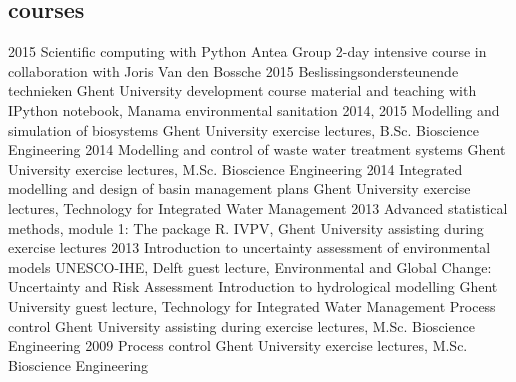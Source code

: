 \documentclass[]{stvhoey-cv}  %
\begin{document}
\subsection*{courses}
\begin{entrylist}
  \entry
    {2015}
    {Scientific computing with Python}
    {Antea Group}
    {2-day intensive course in collaboration with Joris Van den Bossche}
  \entry
    {2015}
    {Beslissingsondersteunende technieken}
    {Ghent University}
    {development course material and teaching with IPython notebook, Manama environmental sanitation}
  \entry
    {2014, 2015}
    {Modelling and simulation of biosystems}
    {Ghent University}
    {exercise lectures, B.Sc. Bioscience Engineering}
   \entry
    {2014} %
    {Modelling and control of waste water treatment systems}
    {Ghent University}
    {exercise lectures, M.Sc. Bioscience Engineering}
   \entry
    {2014}%
    {Integrated modelling and design of basin management plans}
    {Ghent University}
    {exercise lectures, Technology for Integrated Water Management}
   \entry
    {2013}
    {Advanced statistical methods, module 1: The package R.}
    {IVPV, Ghent University}
    {assisting during exercise lectures}
   \entry
    {2013}
    {Introduction to uncertainty assessment of environmental models}
    {UNESCO-IHE, Delft}
    {guest lecture, Environmental and Global Change: Uncertainty and Risk Assessment}
   \entry
    {}
    {Introduction to hydrological modelling}
    {Ghent University}
    {guest lecture, Technology for Integrated Water Management}
   \entry
	{} %
    {Process control}
    {Ghent University}
    {assisting during exercise lectures, M.Sc. Bioscience Engineering}
   \entry
    {2009}
    {Process control}
    {Ghent University}
    {exercise lectures, M.Sc. Bioscience Engineering}
\end{entrylist}
\end{document}
